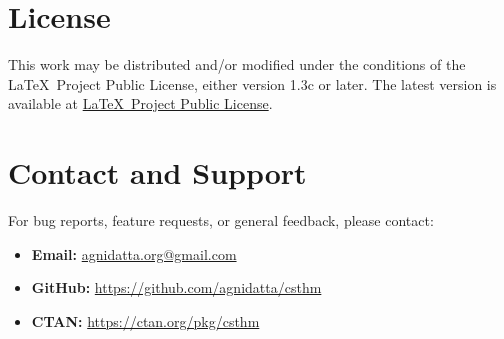 \documentclass{amsart}
\begin{document}
\section{License}

This work may be distributed and/or modified under the conditions of the \LaTeX\ Project Public License, either version 1.3c or later. The latest version is available at \href{http://www.latex-project.org/lppl.txt}{\LaTeX\ Project Public License}.

\section{Contact and Support}

For bug reports, feature requests, or general feedback, please contact:
\begin{itemize}
	\item \textbf{Email:} \url{agnidatta.org@gmail.com}
	\item \textbf{GitHub:} \url{https://github.com/agnidatta/csthm}
	\item \textbf{CTAN:} \url{https://ctan.org/pkg/csthm}
\end{itemize}
\end{document}
